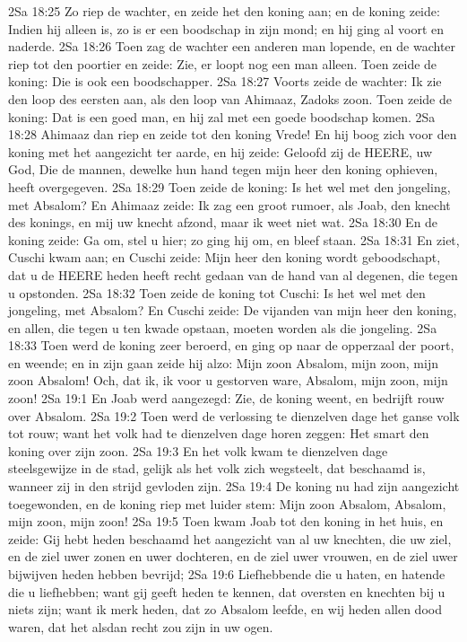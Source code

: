 2Sa 18:25  Zo riep de wachter, en zeide het den koning aan; en de koning zeide: Indien hij alleen is, zo is er een boodschap in zijn mond; en hij ging al voort en naderde.
2Sa 18:26  Toen zag de wachter een anderen man lopende, en de wachter riep tot den poortier en zeide: Zie, er loopt nog een man alleen. Toen zeide de koning: Die is ook een boodschapper.
2Sa 18:27  Voorts zeide de wachter: Ik zie den loop des eersten aan, als den loop van Ahimaaz, Zadoks zoon. Toen zeide de koning: Dat is een goed man, en hij zal met een goede boodschap komen.
2Sa 18:28  Ahimaaz dan riep en zeide tot den koning Vrede! En hij boog zich voor den koning met het aangezicht ter aarde, en hij zeide: Geloofd zij de HEERE, uw God, Die de mannen, dewelke hun hand tegen mijn heer den koning ophieven, heeft overgegeven.
2Sa 18:29  Toen zeide de koning: Is het wel met den jongeling, met Absalom? En Ahimaaz zeide: Ik zag een groot rumoer, als Joab, den knecht des konings, en mij uw knecht afzond, maar ik weet niet wat.
2Sa 18:30  En de koning zeide: Ga om, stel u hier; zo ging hij om, en bleef staan.
2Sa 18:31  En ziet, Cuschi kwam aan; en Cuschi zeide: Mijn heer den koning wordt geboodschapt, dat u de HEERE heden heeft recht gedaan van de hand van al degenen, die tegen u opstonden.
2Sa 18:32  Toen zeide de koning tot Cuschi: Is het wel met den jongeling, met Absalom? En Cuschi zeide: De vijanden van mijn heer den koning, en allen, die tegen u ten kwade opstaan, moeten worden als die jongeling.
2Sa 18:33  Toen werd de koning zeer beroerd, en ging op naar de opperzaal der poort, en weende; en in zijn gaan zeide hij alzo: Mijn zoon Absalom, mijn zoon, mijn zoon Absalom! Och, dat ik, ik voor u gestorven ware, Absalom, mijn zoon, mijn zoon!
2Sa 19:1  En Joab werd aangezegd: Zie, de koning weent, en bedrijft rouw over Absalom.
2Sa 19:2  Toen werd de verlossing te dienzelven dage het ganse volk tot rouw; want het volk had te dienzelven dage horen zeggen: Het smart den koning over zijn zoon.
2Sa 19:3  En het volk kwam te dienzelven dage steelsgewijze in de stad, gelijk als het volk zich wegsteelt, dat beschaamd is, wanneer zij in den strijd gevloden zijn.
2Sa 19:4  De koning nu had zijn aangezicht toegewonden, en de koning riep met luider stem: Mijn zoon Absalom, Absalom, mijn zoon, mijn zoon!
2Sa 19:5  Toen kwam Joab tot den koning in het huis, en zeide: Gij hebt heden beschaamd het aangezicht van al uw knechten, die uw ziel, en de ziel uwer zonen en uwer dochteren, en de ziel uwer vrouwen, en de ziel uwer bijwijven heden hebben bevrijd;
2Sa 19:6  Liefhebbende die u haten, en hatende die u liefhebben; want gij geeft heden te kennen, dat oversten en knechten bij u niets zijn; want ik merk heden, dat zo Absalom leefde, en wij heden allen dood waren, dat het alsdan recht zou zijn in uw ogen.
